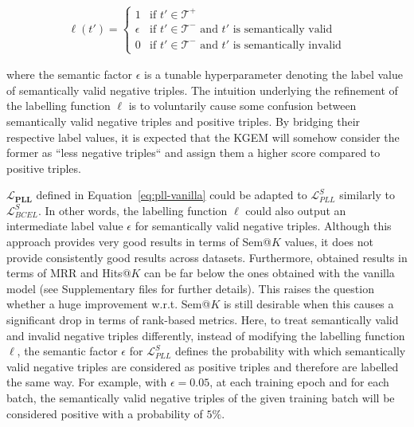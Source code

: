 \documentclass[letterpaper]{article} %
\begin{document}
\begin{equation}
\label{eq:label-bcel}
\begin{aligned}
\ell(t') = \left\{
    \begin{array}{lll}
1 & \mbox{if } t' \in  \mathcal{T^{+}}\\
 \epsilon & \mbox{if } t' \in \mathcal{T^{-}} \text{ and $t'$ is semantically valid} \\ 
 0 & \mbox{if } t' \in \mathcal{T^{-}} \text{ and $t'$ is semantically invalid}
    \end{array}
\right.
\end{aligned}
\end{equation}

where the semantic factor $\epsilon$ is a tunable hyperparameter denoting the label value of semantically valid negative triples. The intuition underlying the refinement of the labelling function $\ell$ is to voluntarily cause some confusion between semantically valid negative triples and positive triples.
By bridging their respective label values, it is expected that the KGEM will somehow consider the former as ``less negative triples`` and assign them a higher score compared to positive triples.

$\mathbf{\mathcal{L}_{PLL}}$ defined in Equation~\eqref{eq:pll-vanilla} could be adapted to $\mathcal{L}^{S}_{PLL}$ similarly to $\mathcal{L}^{S}_{BCEL}$. In other words, the labelling function $\ell$ could also output an intermediate label value $\epsilon$ for semantically valid negative triples. Although this approach provides very good results in terms of Sem@$K$ values, it does not provide consistently good results across datasets.
Furthermore, obtained results in terms of MRR and Hits@$K$ can be far below the ones obtained with the vanilla model (see Supplementary files for further details).
This raises the question whether a huge improvement w.r.t. Sem@$K$ is still desirable when this causes a significant drop in terms of rank-based metrics. Here, to treat semantically valid and invalid negative triples differently, instead of modifying the labelling function $\ell$, the semantic factor $\epsilon$ for $\mathcal{L}^{S}_{PLL}$ defines the probability with which semantically valid negative triples are considered as positive triples and therefore are labelled the same way. For example, with $\epsilon = 0.05$, at each training epoch and for each batch, the semantically valid negative triples of the given training batch will be considered positive with a probability of $5\%$.
\end{document}
